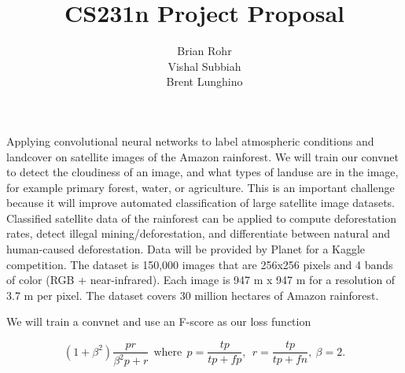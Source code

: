 \documentclass[12pt]{article}
\title{CS231n Project Proposal}
\author{Brian Rohr\\Vishal Subbiah\\Brent Lunghino}
\begin{document}
\maketitle	

Applying convolutional neural networks to label atmospheric conditions and landcover on satellite images of the Amazon rainforest. We will train our convnet to detect the cloudiness of an image, and what types of landuse are in the image, for example primary forest, water, or agriculture. This is an important challenge because it will improve automated classification of large satellite image datasets. Classified satellite data of the rainforest can be applied to compute deforestation rates, detect illegal mining/deforestation, and differentiate between natural and human-caused deforestation.
Data will be provided by Planet for a Kaggle competition. The dataset is 150,000 images that are 256x256 pixels and 4 bands of color (RGB + near-infrared). Each image is 947 m x 947 m for a resolution of 3.7 m per pixel. The dataset covers 30 million hectares of Amazon rainforest. 

We will train a convnet and use an F-score as our loss function

\begin{equation} \label{eq:F_score}
(1 + \beta^2) \frac{pr}{\beta^2 p+r}\ \ \mathrm{where}\ \ p = \frac{tp}{tp+fp},\ \ r = \frac{tp}{tp+fn},\ \beta = 2.
\end{equation}
\end{document}
